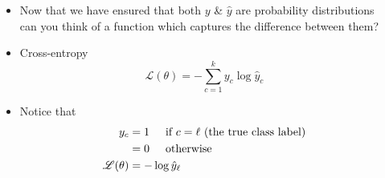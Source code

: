 \begin{frame}
  \begin{columns}
    \begin{overlayarea}{\textwidth}{\textheight}
      \vspace{0.3cm}
      \makebox[\textwidth][c]{\usebox{\nnfruitclassexamplecontent}}
    \end{overlayarea}

    \begin{overlayarea}{\textwidth}{\textheight}
      \begin{itemize}
        \item<1-> Now that we have ensured that both $y$ \& $\hat{y}$ are probability distributions can you think of a function which captures the difference between them?
        \item<2-> Cross-entropy \begin{equation*}
              \mathscr{L}(\theta) = - \sum_{c=1}^{k} y_c \log \hat{y}_c
            \end{equation*}
        \item<3-> Notice that \begin{align*}
              y_c                 & = 1 \hspace{0.5cm} \text{if $c=\ell$ (the true class label)} \\
                        & = 0 \hspace{0.5cm} \text{otherwise}                          \\
              \mathscr{L}(\theta) & = - \log \hat{y}_{\ell}
            \end{align*}
      \end{itemize}
    \end{overlayarea}
  \end{columns}
\end{frame}

